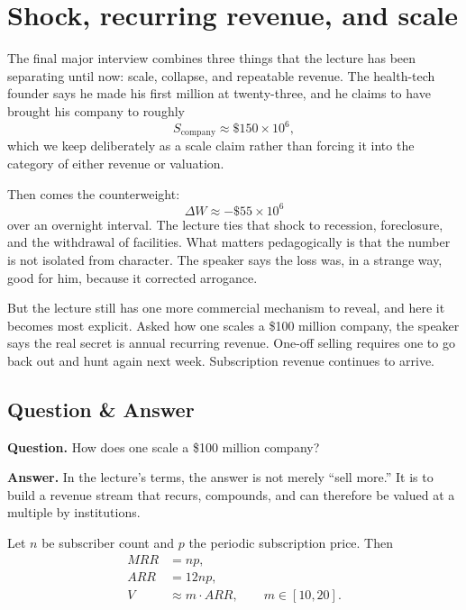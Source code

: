 \section{Shock, recurring revenue, and scale}

The final major interview combines three things that the lecture has been separating until now: scale, collapse, and repeatable revenue. The health-tech founder says he made his first million at twenty-three, and he claims to have brought his company to roughly
\begin{equation}
S_{\text{company}} \approx \$150 \times 10^6,
\end{equation}
which we keep deliberately as a scale claim rather than forcing it into the category of either revenue or valuation.

Then comes the counterweight:
\begin{equation}
\Delta W \approx -\$55 \times 10^6
\end{equation}
over an overnight interval. The lecture ties that shock to recession, foreclosure, and the withdrawal of facilities. What matters pedagogically is that the number is not isolated from character. The speaker says the loss was, in a strange way, good for him, because it corrected arrogance.

But the lecture still has one more commercial mechanism to reveal, and here it becomes most explicit. Asked how one scales a \$100 million company, the speaker says the real secret is annual recurring revenue. One-off selling requires one to go back out and hunt again next week. Subscription revenue continues to arrive.

\subsection{Question \& Answer}

\textbf{Question.} How does one scale a \$100 million company?

\textbf{Answer.} In the lecture's terms, the answer is not merely ``sell more.'' It is to build a revenue stream that recurs, compounds, and can therefore be valued at a multiple by institutions.

Let \(n\) be subscriber count and \(p\) the periodic subscription price. Then
\begin{align}
MRR &= np,\\
ARR &= 12np,\\
V &\approx m \cdot ARR, \qquad m \in [10,20].
\end{align}

